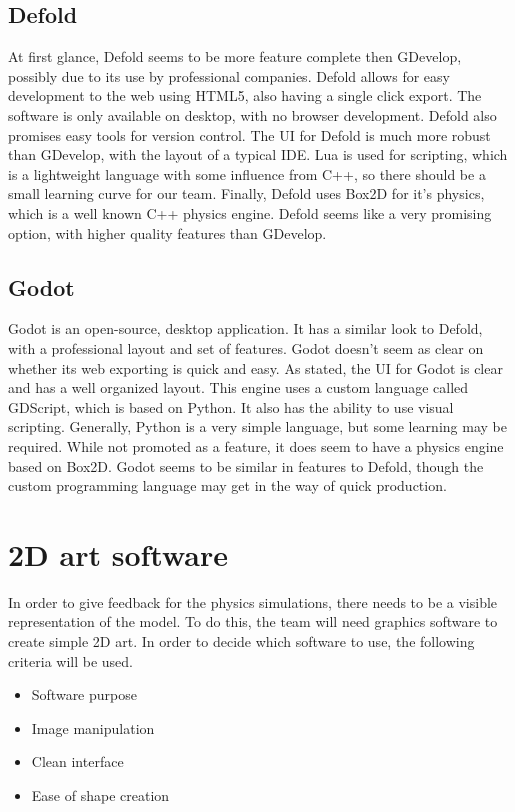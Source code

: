 \documentclass[capstone.tex]{subfiles}
\begin{document}
\subsection{Defold}
At first glance, Defold seems to be more feature complete then GDevelop, possibly due to its use by professional companies. Defold allows for easy development to the web using HTML5, also having a single click export. The software is only available on desktop, with no browser development. Defold also promises easy tools for version control. The UI for Defold is much more robust than GDevelop, with the layout of a typical IDE. Lua is used for scripting, which is a lightweight language with some influence from C++, so there should be a small learning curve for our team. Finally, Defold uses Box2D \cite{box2d} for it’s physics, which is a well known C++ physics engine. Defold seems like a very promising option, with higher quality features than GDevelop.
\cite{defold}
\subsection{Godot}
Godot is an open-source, desktop application. It has a similar look to Defold, with a professional layout and set of features. Godot doesn’t seem as clear on whether its web exporting is quick and easy. As stated, the UI for Godot is clear and has a well organized layout. This engine uses a custom language called GDScript, which is based on Python. It also has the ability to use visual scripting. Generally, Python is a very simple language, but some learning may be required. While not promoted as a feature, it does seem to have a physics engine based on Box2D. Godot seems to be similar in features to Defold, though the custom programming language may get in the way of quick production.
\cite{godot}
\section{2D art software}
In order to give feedback for the physics simulations, there needs to be a visible representation of the model. To do this, the team will need graphics software to create simple 2D art. In order to decide which software to use, the following criteria will be used.
\begin{itemize}
    \item Software purpose
    \item Image manipulation
    \item Clean interface
    \item Ease of shape creation
\end{itemize}
\end{document}
